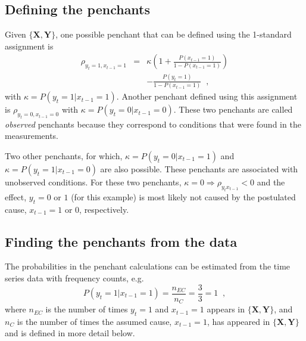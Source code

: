 \documentclass[twocolumn,aps,pre,groupedaddress]{revtex4-1}
\begin{document}
\subsection{Defining the penchants}
Given $\{\mathbf{X},\mathbf{Y}\}$, one possible penchant that can be defined using the 1-standard assignment is
\begin{eqnarray*}
\rho_{y_{t}=1,x_{t-1}=1} &=& \kappa \left(1+\frac{P\left(x_{t-1} = 1\right)}{1-P\left(x_{t-1} = 1\right)}\right)\\
& & -\frac{P\left(y_{t} = 1\right)}{1-P\left(x_{t-1} = 1\right)}\;\;,
\end{eqnarray*}
with $\kappa = P\left( y_t = 1 | x_{t-1} = 1\right)$.  Another penchant defined using this assignment is $\rho_{y_t=0,x_{t-1}=0}$ with  $\kappa = P\left( y_t = 0 | x_{t-1} = 0\right)$.  These two penchants are called {\em observed} penchants because they correspond to conditions that were found in the measurements.  

Two other penchants, for which, $\kappa = P\left( y_t = 0 | x_{t-1} = 1\right)$ and $\kappa = P\left( y_t = 1 | x_{t-1} = 0\right)$ are also possible.  These penchants are associated with unobserved conditions.  For these two penchants, $\kappa=0\Rightarrow \rho_{y_{t}x_{t-1}} < 0$ and the effect, $y_t = 0$ or $1$ (for this example) is most likely not caused by the postulated cause, $x_{t-1} = 1$ or $0$, respectively.  


\subsection{Finding the penchants from the data}
The probabilities in the penchant calculations can be estimated from the time series data with frequency counts, e.g.\
$$
P\left( y_t = 1 | x_{t-1} = 1\right) = \frac{n_{EC}}{n_C} = \frac{3}{3} = 1\;\;,
$$
where $n_{EC}$ is the number of times $y_t=1$ and $x_{t-1}=1$ appears in $\{\mathbf{X},\mathbf{Y}\}$, and $n_{C}$ is the number of times the assumed cause, $x_{t-1}=1$, has appeared in $\{\mathbf{X},\mathbf{Y}\}$ and is defined in more detail below.      
\end{document}
